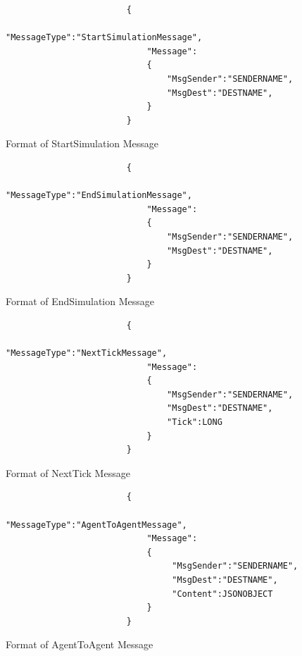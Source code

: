 \begin{enumerate}
\begin{figure}[H]
\centering
\begin{verbatim}
                        {
                        	"MessageType":"StartSimulationMessage",
                         	"Message":
                         	{
 	                        	"MsgSender":"SENDERNAME",
 	                        	"MsgDest":"DESTNAME",
 	                        }
                        }
\end{verbatim}
\caption{Format of StartSimulation Message}
\label{fig:StartSimulation}
\end{figure}

\begin{figure}[H]
\centering
\begin{verbatim}
                        {
                        	"MessageType":"EndSimulationMessage",
                         	"Message":
                         	{
 	                        	"MsgSender":"SENDERNAME",
 	                        	"MsgDest":"DESTNAME",
 	                        }
                        }
\end{verbatim}
\caption{Format of EndSimulation Message}
\label{fig:EndSimulation}
\end{figure}

\begin{figure}[H]
\centering
\begin{verbatim}
                        {
                        	"MessageType":"NextTickMessage",
                         	"Message":
 	                        {
 	                        	"MsgSender":"SENDERNAME",
 	                        	"MsgDest":"DESTNAME",
 	                        	"Tick":LONG
 	                        }
                        }
\end{verbatim}
\caption{Format of NextTick Message}
\label{fig:NextTick}
\end{figure}

\begin{figure}[H]
\begin{verbatim}
                        {
                        	"MessageType":"AgentToAgentMessage",
                        	"Message":
                        	{
                        		 "MsgSender":"SENDERNAME",
                        		 "MsgDest":"DESTNAME",
                        		 "Content":JSONOBJECT
                        	}
                        }
\end{verbatim}
\caption{Format of AgentToAgent Message}
\label{fig:AgentToAgentMessage}
\end{figure}
    

\end{enumerate}
